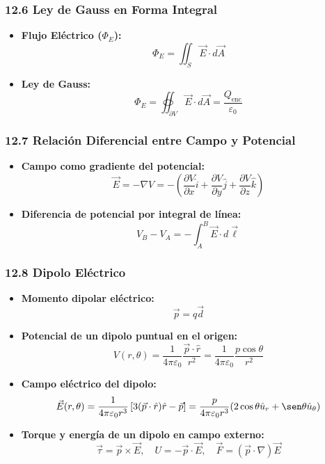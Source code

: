 \documentclass[11pt,a4paper]{article}
\begin{document}
\subsubsection*{12.6 Ley de Gauss en Forma Integral}

\begin{itemize}
  \item \textbf{Flujo Eléctrico ($\Phi_E$):}
  \[
    \Phi_E = \iint_S \vec{E} \cdot d\vec{A}
  \]
  \item \textbf{Ley de Gauss:}
  \[
    \Phi_E = \oiint_{\partial V} \vec{E} \cdot d\vec{A} = \frac{Q_{\text{enc}}}{\varepsilon_0}
  \]
\end{itemize}

\subsubsection*{12.7 Relación Diferencial entre Campo y Potencial}

\begin{itemize}
  \item \textbf{Campo como gradiente del potencial:}
  \[
    \vec{E} = -\nabla V = -\left( \frac{\partial V}{\partial x}\hat{i} + \frac{\partial V}{\partial y}\hat{j} + \frac{\partial V}{\partial z}\hat{k} \right)
  \]
  \item \textbf{Diferencia de potencial por integral de línea:}
  \[
    V_B - V_A = -\int_A^B \vec{E} \cdot d\vec{\ell}
  \]
\end{itemize}

\subsubsection*{12.8 Dipolo Eléctrico}

\begin{itemize}
  \item \textbf{Momento dipolar eléctrico:}
  \[
    \vec{p} = q \vec{d}
  \]
  \item \textbf{Potencial de un dipolo puntual en el origen:}
  \[
    V(r, \theta) = \frac{1}{4\pi\varepsilon_0} \frac{\vec{p} \cdot \hat{r}}{r^2} = \frac{1}{4\pi\varepsilon_0} \frac{p \cos\theta}{r^2}
  \]
  \item \textbf{Campo eléctrico del dipolo:}
  \[
    \vec{E}(r, \theta) = \frac{1}{4\pi\varepsilon_0 r^3} \left[ 3(\vec{p} \cdot \hat{r})\hat{r} - \vec{p} \right] = \frac{p}{4\pi\varepsilon_0 r^3} (2\cos\theta \hat{u}_r + \sen\theta \hat{u}_\theta)
  \]
  \item \textbf{Torque y energía de un dipolo en campo externo:}
  \[
    \vec{\tau} = \vec{p} \times \vec{E}, \quad U = -\vec{p} \cdot \vec{E}, \quad \vec{F} = (\vec{p} \cdot \nabla)\vec{E}
  \]
\end{itemize}
\end{document}
